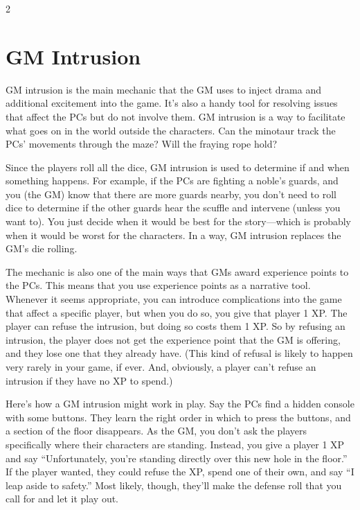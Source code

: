 \begin{multicols}{2}
\chapter{GM Intrusion}

GM intrusion is the main mechanic that the GM uses to inject drama and additional excitement into the game. It’s also a handy tool for resolving issues that affect the PCs but do not involve them. GM intrusion is a way to facilitate what goes on in the world outside the characters. Can the minotaur track the PCs’ movements through the maze? Will the fraying rope hold?

Since the players roll all the dice, GM intrusion is used to determine if and when something happens. For example, if the PCs are fighting a noble’s guards, and you (the GM) know that there are more guards nearby, you don’t need to roll dice to determine if the other guards hear the scuffle and intervene (unless you want to). You just decide when it would be best for the story—which is probably when it would be worst for the characters. In a way, GM intrusion replaces the GM’s die rolling.

The mechanic is also one of the main ways that GMs award experience points to the PCs. This means that you use experience points as a narrative tool. Whenever it seems appropriate, you can introduce complications into the game that affect a specific player, but when you do so, you give that player 1 XP. The player can refuse the intrusion, but doing so costs them 1 XP. So by refusing an intrusion, the player does not get the experience point that the GM is offering, and they lose one that they already have. (This kind of refusal is likely to happen very rarely in your game, if ever. And, obviously, a player can’t refuse an intrusion if they have no XP to spend.)

Here’s how a GM intrusion might work in play. Say the PCs find a hidden console with some buttons. They learn the right order in which to press the buttons, and a section of the floor disappears. As the GM, you don’t ask the players specifically where their characters are standing. Instead, you give a player 1 XP and say “Unfortunately, you’re standing directly over this new hole in the floor.” If the player wanted, they could refuse the XP, spend one of their own, and say “I leap aside to safety.” Most likely, though, they’ll make the defense roll that you call for and let it play out.


\end{multicols}
